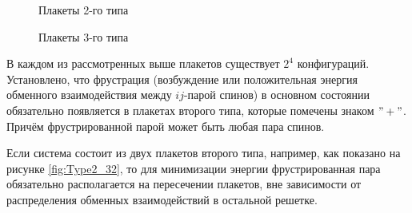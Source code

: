 \documentclass[utf8, babel, sor, jor, amsmath, amssymb, reprint]{elsarticle} %
\begin{document}
\begin{figure}[H]
\begin{minipage}{0.3\textwidth}
		\caption{Плакеты 2-го типа}
		\label{fig:Type2}
	\end{minipage}
	\hspace{5pt}
	\begin{minipage}{0.3\textwidth}
		\centering
		\hspace{-4pt} 
		\caption{Плакеты 3-го типа}
		\label{fig:Type3}
	\end{minipage}
\end{figure}


В каждом из рассмотренных выше плакетов существует $2^4$ конфигураций.
Установлено, что фрустрация (возбуждение или положительная энергия обменного взаимодействия между $ij$-парой спинов) в основном состоянии обязательно появляется в плакетах второго типа, которые помечены знаком $"+"$. Причём фрустрированной парой может быть любая пара спинов.


Если система состоит из двух плакетов второго типа, например, как показано на рисунке \ref{fig:Type2_32}, то для минимизации энергии фрустрированная пара обязательно располагается на пересечении плакетов, вне зависимости от распределения обменных взаимодействий в остальной решетке. 
\end{document}
